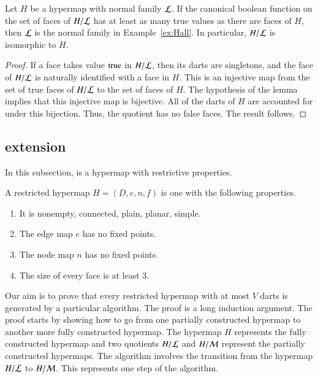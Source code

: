 \begin{lemma}  
Let $H$ be a hypermap with normal family ${\cal L}$. If the canonical boolean function on the set of faces of $H/{\cal L}$ has at least as many true values as there are faces of $H$, then $\cal L$ is the normal family in Example~\ref{ex:Hall}. In particular, $H/{\cal L}$ is isomorphic to $H$.
\end{lemma}

\begin{proof}  If a face takes value ${\operatorname{true}}$ in $H/{\cal L}$, then its darts are singletons, and the face of $H/{\cal L}$ is naturally identified with a face in $H$.  This is an injective map from the set of true faces of $H/{\cal L}$ to the set of faces of $H$.  The hypothesis of the lemma implies that this injective map is bijective. All of the darts of $H$ are accounted for under this bijection. Thus, the quotient has no false faces.  The result follows.
\end{proof}


\subsection{extension}\label{sec:face-insert}

In this subsection,  is a hypermap with restrictive properties.

\begin{definition}[restricted]\label{def:restricted}
A restricted hypermap $H = (D,e,n,f)$ is one with the following properties.
    \begin{enumerate}
        \item It is nonempty, connected, plain, planar, simple.
        \item The edge map $e$ has no fixed points.
        \item The node map $n$ has no fixed points.
        \item The size of every face is at least $3$.
    \end{enumerate}
\end{definition}


Our aim is to prove that every restricted hypermap with at most $V$ darts is generated by a particular algorithm.  The proof is a long induction argument.  The proof starts by showing how to go from one partially constructed hypermap to another more fully constructed hypermap.  The hypermap $H$ represents the fully constructed hypermap and two quotients $H/{\cal L}$ and $H/{\cal M}$ represent the partially constructed hypermaps.  The algorithm involves the transition from the hypermap $H/{\cal L}$ to $H/{\cal M}$.  This represents one step of the algorithm.

